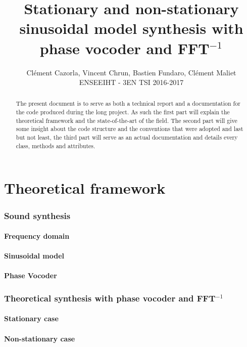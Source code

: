 \documentclass[]{article}
\title{Stationary and non-stationary sinusoidal model synthesis with phase vocoder and FFT$^{-1}$}
\author{Cl\'ement Cazorla, Vincent Chrun, Bastien Fundaro, Cl\'ement Maliet \\ENSEEIHT - 3EN TSI 2016-2017}
\begin{document}
\maketitle

\begin{abstract}
The present document is to serve as both a technical report and a documentation for the code produced during the long project. As such the first part will explain the theoretical framework and the state-of-the-art of the field. The second part will give some insight about the code structure and the conventions that were adopted and last but not least, the third part will serve as an actual documentation and details every class, methods and attributes.
\end{abstract}
\newpage
\tableofcontents


\newpage
\part{Theoretical framework}\label{sec:theoretical-framework}
\section{Sound synthesis}\label{sec:sound-synthesis}
\subsection{Frequency domain}\label{sec:frequency-domain}
\subsection{Sinusoidal model}\label{sec:sinusoidal-model}
\subsection{Phase Vocoder}\label{sec:phase-vocoder}
\section{Theoretical synthesis with phase vocoder and FFT$^{-1}$}\label{sec:theoretical-synthesis-with-phase-vocoder-and-fft-1}
\subsection{Stationary case}\label{sec:stationary-case}
\subsection{Non-stationary case}\label{sec:non-stationary-case}
\end{document}
